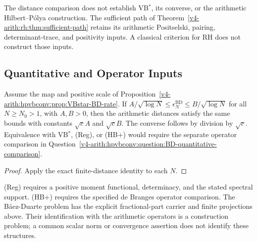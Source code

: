 \begin{remark}
\label{v4-arith:hpvbconv:rem:converse-does-not-help}
The distance comparison does not establish VB\(^{*}\), its converse,
or the arithmetic Hilbert--P\'olya construction. The sufficient
path of Theorem~\ref{v4-arith:rh:thm:sufficient-path} retains its
arithmetic Positselski, pairing, determinant-trace, and positivity
inputs. A classical criterion for RH does not construct those inputs.
\end{remark}

\subsection{Quantitative and Operator Inputs}
\label{v4-arith:hpvbconv:strictly-finer}
\begin{corollary}
\label{v4-arith:hpvbconv:cor:rate-transport}
Assume the map and positive scale of
Proposition~\ref{v4-arith:hpvbconv:prop:VBstar-BD-rate}. If
\(A/\sqrt{\log N}\le\epsilon_N^{\mathrm{BD}}
\le B/\sqrt{\log N}\) for all \(N\ge N_0>1\), with \(A,B>0\),
then the arithmetic distances satisfy the same bounds with constants
\(\sqrt c A\) and \(\sqrt c B\). The converse follows by division
by \(\sqrt c\). Equivalence with VB\(^{*}\), (Reg), or (HB+) would
require the separate operator comparison in
Question~\ref{v4-arith:hpvbconv:question:BD-quantitative-comparison}.
\end{corollary}
\begin{proof}
Apply the exact finite-distance identity to each \(N\).
\end{proof}

\begin{remark}
\label{v4-arith:hpvbconv:rem:strict-content}
(Reg) requires a positive moment functional, determinacy, and the
stated spectral support. (HB+) requires the specified de Branges
operator comparison. The B\'aez-Duarte problem has the explicit
fractional-part carrier and finite projections above. Their
identification with the arithmetic operators is a construction
problem; a common scalar norm or convergence assertion does not
identify these structures.
\end{remark}

